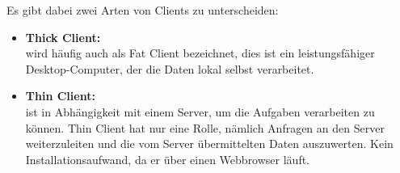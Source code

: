 Es gibt dabei zwei Arten von Clients zu unterscheiden:
\begin{itemize}
\item \textbf{Thick Client:}\\
wird häufig auch als Fat Client bezeichnet, dies ist ein leistungsfähiger Desktop-Computer, der die Daten lokal selbst verarbeitet.
\item \textbf{Thin Client:}\\
ist in Abhängigkeit mit einem Server, um die Aufgaben verarbeiten zu können. Thin Client hat nur eine Rolle, nämlich Anfragen an den Server weiterzuleiten und die vom Server übermittelten Daten auszuwerten. Kein Installationsaufwand, da er über einen Webbrowser läuft. 
\end{itemize}